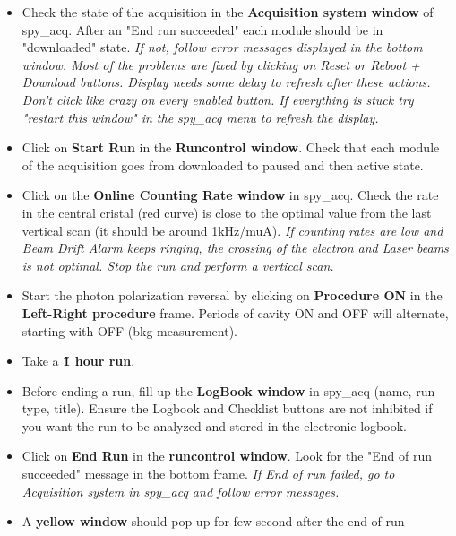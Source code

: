 {{\begin{itemize}
\begin{itemize}
\item Check Random, Mouly and central cristal are activated.
\item Check {\bf Raw data rates}. Assuming a trigger rate of 1kHz/muA, 
   prescaler factors should keep the read data rates at the few kHz level.
\item Check the trigger condition in {\bf General Daq setup} (Photon only, 
   e only, coinc, ...). 
\end{itemize}
\item Check the state of the acquisition in the {\bf Acquisition system window} 
of spy\_acq. After an "End run succeeded" each module should be in "downloaded" 
state. 
{\it If not, follow error messages displayed in the bottom window. Most of 
the problems are fixed by clicking on Reset or Reboot + Download buttons. Display needs 
some delay to refresh after these  actions. Don't click like crazy on every 
enabled button. If everything is stuck try "restart this window" in the 
spy\_acq menu to refresh the display.}
\item Click on {\bf Start Run} in the {\bf Runcontrol window}. Check that 
each module of the acquisition goes from downloaded to paused and then active 
state.
\item Click on the {\bf Online Counting Rate window} in spy\_acq. Check the rate 
in the central cristal (red curve) is close to the optimal value from the last 
vertical scan (it should be around 1kHz/muA).
{\it If counting rates are low and Beam Drift Alarm keeps ringing, the 
crossing of the electron and Laser beams is not optimal. Stop the run and 
perform a 
vertical scan.}
\item Start the photon polarization reversal by clicking on {\bf Procedure ON} 
in the {\bf Left-Right procedure} frame. Periods of cavity ON and OFF will 
alternate, starting with OFF (bkg measurement).
\item Take a {\bf \~1 hour run}.
\item Before ending a run, fill up the {\bf LogBook window} in spy\_acq (name, 
run type, title). Ensure the Logbook and Checklist buttons are not inhibited
if you want the run to be analyzed and stored in the electronic logbook.
\item Click on {\bf End Run} in the {\bf runcontrol window}. Look for the 
"End of run succeeded" message in the bottom frame.
{\it If End of run failed, go to Acquisition system in spy\_acq and follow 
error messages.}
\item A {\bf yellow window} should pop up for few second after the end of run 

\end{itemize}}}
